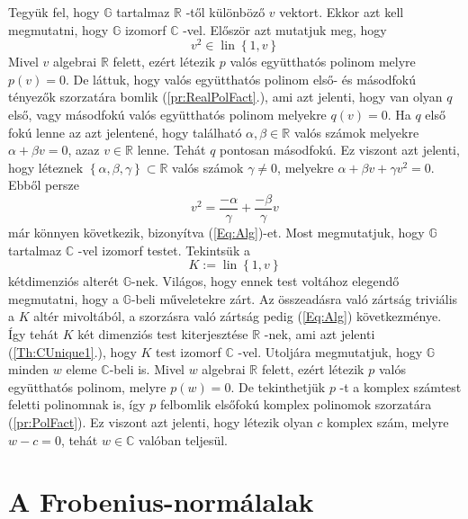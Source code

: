 \documentclass[9pt, a4paper, showtrims]{memoir}
\makeatletter
\renewenvironment{proof}[1][\proofname]
    {\par\pushQED{\qed}%
    \normalfont \topsep6\p@\@plus6\p@\relax
    \trivlist
    \item[\hskip\labelsep
        \itshape
    #1\@addpunct{:}]\ignorespaces}
    {\popQED\endtrivlist\@endpefalse}
\theoremstyle{plain}
\theoremstyle{remark}
\theoremstyle{definition}
\DeclareMathOperator{\lin}{lin}
\makeatother
\begin{document}
\begin{proof}
	Tegyük fel, hogy $\mathbb{G}$ tartalmaz $\mathbb{R}$ -től különböző $v$ vektort.
	Ekkor azt kell megmutatni, hogy $\mathbb{G}$ izomorf $\mathbb{C}$ -vel.\newline
	Először azt mutatjuk meg, hogy
	\begin{equation}
		v^{2}\in \lin\left\{ 1,v\right\}
	\end{equation}
	\label{Eq:Alg}Mivel $v$ algebrai $\mathbb{R}$ felett, ezért létezik $p$
	valós együtthatós polinom melyre $p\left( v\right) =0$.
	De láttuk, hogy valós együtthatós polinom első- és másodfokú tényezők szorzatára bomlik (\ref{pr:RealPolFact}.),
	ami azt jelenti, hogy van olyan $q$ első, vagy másodfokú valós együtthatós polinom melyekre $q\left( v\right) =0$.
	Ha $q$ első
	fokú lenne az azt jelentené, hogy található $\alpha ,\beta
		\in \mathbb{R}$ valós számok melyekre $\alpha +\beta v=0$, azaz $v\in \mathbb{R}$ lenne.
	Tehát $q$ pontosan másodfokú.
	Ez viszont azt
	jelenti, hogy léteznek $\left\{ \alpha ,\beta ,\gamma \right\} \subset
		\mathbb{R}$ valós számok $\gamma \neq 0$, melyekre $\alpha +\beta
		v+\gamma v^{2}=0$.
	Ebből persze
	\[
		v^{2}=\frac{-\alpha }{\gamma }+\frac{-\beta }{\gamma }v
	\]
	már könnyen következik, bizonyítva (\ref{Eq:Alg})-et.\newline
	Most megmutatjuk, hogy $\mathbb{G}$ tartalmaz $\mathbb{C}$ -vel izomorf testet.
	Tekintsük a
	\[
		K:=\lin\left\{ 1,v\right\}
	\]
	kétdimenziós alterét $\mathbb{G}$-nek.
	Világos, hogy ennek test
	voltához elegendő megmutatni, hogy a $\mathbb{G}$-beli műveletekre zárt.
	Az összeadásra való zártság triviális a $K$
	altér mivoltából, a szorzásra való zártság pedig
	(\ref{Eq:Alg}) következménye.
	\'{I}gy tehát $K$ két dimenziós test kiterjesztése $\mathbb{R}$ -nek, ami azt jelenti (\ref{Th:CUnique1}.),
	hogy $K$ test izomorf $\mathbb{C}$ -vel.\newline
	Utoljára megmutatjuk, hogy $\mathbb{G}$ minden $w$ eleme $\mathbb{C}$-beli
	is.
	Mivel $w$ algebrai $\mathbb{R}$ felett, ezért létezik $p$ valós együtthatós polinom, melyre $p\left( w\right) =0$.
	De tekinthetjük $p$ -t a komplex számtest feletti polinomnak is, így $p$
	felbomlik elsőfokú komplex polinomok szorzatára (\ref{pr:PolFact}).
	Ez viszont azt jelenti, hogy létezik olyan $c$ komplex szám,
	melyre $w-c=0$, tehát $w\in \mathbb{C}$ valóban teljesül.
\end{proof}

\chapter{A Frobenius-normálalak}
\end{document}

